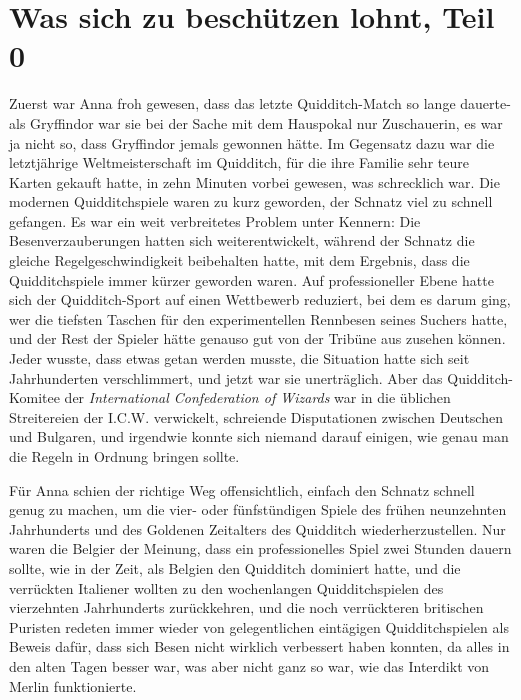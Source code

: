 \chapter{Was sich zu beschützen lohnt, Teil 0}

Zuerst war Anna froh gewesen, dass das letzte Quidditch-Match so lange dauerte-
als Gryffindor war sie bei der Sache mit dem Hauspokal nur Zuschauerin, es war
ja nicht so, dass Gryffindor jemals gewonnen hätte. Im Gegensatz dazu war die
letztjährige Weltmeisterschaft im Quidditch, für die ihre Familie sehr teure
Karten gekauft hatte, in zehn Minuten vorbei gewesen, was schrecklich war. Die
modernen Quidditchspiele waren zu kurz geworden, der Schnatz viel zu schnell
gefangen. Es war ein weit verbreitetes Problem unter Kennern: Die
Besenverzauberungen hatten sich weiterentwickelt, während der Schnatz die
gleiche Regelgeschwindigkeit beibehalten hatte, mit dem Ergebnis, dass die
Quidditchspiele immer kürzer geworden waren. Auf professioneller Ebene hatte
sich der Quidditch-Sport auf einen Wettbewerb reduziert, bei dem es darum ging,
wer die tiefsten Taschen für den experimentellen Rennbesen seines Suchers hatte,
und der Rest der Spieler hätte genauso gut von der Tribüne aus zusehen können.
Jeder wusste, dass etwas getan werden musste, die Situation hatte sich seit
Jahrhunderten verschlimmert, und jetzt war sie unerträglich. Aber das
Quidditch-Komitee der \emph{International Confederation of Wizards} war in die
üblichen Streitereien der I.C.W. verwickelt, schreiende Disputationen zwischen
Deutschen und Bulgaren, und irgendwie konnte sich niemand darauf einigen, wie
genau man die Regeln in Ordnung bringen sollte.

Für Anna schien der richtige Weg offensichtlich, einfach den Schnatz schnell
genug zu machen, um die vier- oder fünfstündigen Spiele des frühen neunzehnten
Jahrhunderts und des Goldenen Zeitalters des Quidditch wiederherzustellen. Nur
waren die Belgier der Meinung, dass ein professionelles Spiel zwei Stunden
dauern sollte, wie in der Zeit, als Belgien den Quidditch dominiert hatte, und
die verrückten Italiener wollten zu den wochenlangen Quidditchspielen des
vierzehnten Jahrhunderts zurückkehren, und die noch verrückteren britischen
Puristen redeten immer wieder von gelegentlichen eintägigen Quidditchspielen als
Beweis dafür, dass sich Besen nicht wirklich verbessert haben konnten, da alles
in den alten Tagen besser war, was aber nicht ganz so war, wie das Interdikt von
Merlin funktionierte.

